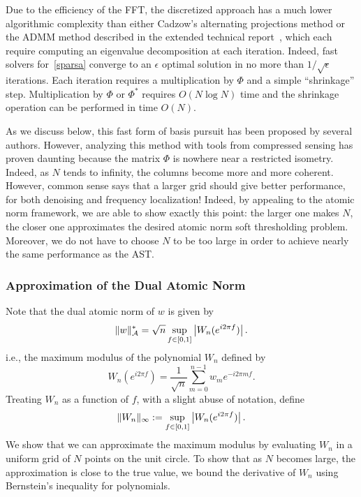 Due to the efficiency of the FFT, the discretized approach has a much lower
algorithmic complexity than either Cadzow's alternating projections method or
the ADMM method described in the extended technical report~\cite{btr12}, which
each require computing an eigenvalue decomposition at each iteration. Indeed,
fast solvers for~\eqref{sparsa} converge to an $\epsilon$ optimal solution in no
more than $1/\sqrt{\epsilon}$ iterations. Each iteration requires a
multiplication by $\Phi$ and a simple ``shrinkage'' step. Multiplication by
$\Phi$ or $\Phi^*$ requires $O(N\log N)$ time and the shrinkage operation can be
performed in time $O(N)$.

As we discuss below, this fast form of basis pursuit has been proposed by
several authors. However, analyzing this method with tools from compressed
sensing has proven daunting because the matrix $\Phi$ is nowhere near a
restricted isometry. Indeed, as $N$ tends to infinity, the columns become more
and more coherent. However, common sense says that a larger grid should give
better performance, for both denoising and frequency localization! Indeed, by
appealing to the atomic norm framework, we are able to show exactly this point:
the larger one makes $N$, the closer one approximates the desired atomic norm
soft thresholding problem. Moreover, we do not have to choose $N$ to be too
large in order to achieve nearly the same performance as the AST.

\subsubsection{Approximation of the Dual Atomic Norm}
\label{proof:dual-norm-approximation}
Note that the dual atomic norm of $w$ is given by
\begin{equation}
  \label{eq:maximum-modulus}
  \lVert w\rVert_{\mathcal{A}}^* = \sqrt{n}\sup_{f \in [0,1]} \left| W_n(e^{i2\pi f}) \right|.
\end{equation}
i.e., the maximum modulus of the polynomial $W_n$ defined by
\begin{equation}
\label{eq:random-poly}
W_n(e^{i2\pi f}) =\frac{1}{\sqrt{n}} \sum_{m=0}^{n-1}{w_m e^{-i 2 \pi m f}}.
\end{equation}
Treating $W_n$ as a function of $f$,  with a slight abuse of  notation, define
\begin{equation*}
\lVert W_n\rVert_\infty := \sup_{f \in [0,1]} \left| W_n(e^{i2\pi f}) \right|.
\end{equation*}
We show that we can approximate the maximum modulus by evaluating $W_n$ in a
uniform grid of $N$ points on the unit circle. To show that as $N$ becomes large,
the approximation is close to the true value, we bound the derivative of $W_n$ 
using Bernstein's inequality for polynomials.

